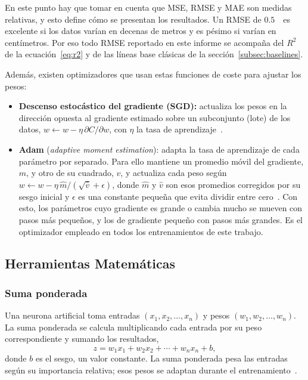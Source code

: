 \documentclass[titlepage,11pt]{article}
\providecommand{\num}[1]{\ensuremath{#1}}
\begin{document}
En este punto hay que tomar en cuenta que MSE, RMSE y MAE son medidas
relativas, y esto define cómo se presentan los resultados. Un RMSE de
\num{0.5}~\meter\ es excelente si los datos varían en decenas de metros y es
pésimo si varían en centímetros. Por eso todo RMSE reportado en este informe se
acompaña del $R^2$ de la ecuación~\eqref{eq:r2} y de las líneas base clásicas
de la sección~\ref{subsec:baselines}.

Además, existen optimizadores que usan estas funciones de coste para ajustar
los pesos:
\begin{itemize}
\item \textbf{Descenso estocástico del gradiente (SGD):} actualiza los pesos en
  la dirección opuesta al gradiente estimado sobre un subconjunto (lote) de los
  datos, $w \leftarrow w - \eta\,\partial C/\partial w$, con $\eta$ la tasa de
  aprendizaje~\cite{goodfellow_2016_deep}.
\item \textbf{Adam} (\emph{adaptive moment estimation}): adapta la tasa de
  aprendizaje de cada parámetro por separado. Para ello mantiene un promedio
  móvil del gradiente, $m$, y otro de su cuadrado, $v$, y actualiza cada peso
  según $w \leftarrow w - \eta\,\hat m/(\sqrt{\hat v}+\epsilon)$, donde $\hat m$
  y $\hat v$ son esos promedios corregidos por su sesgo inicial y $\epsilon$ es
  una constante pequeña que evita dividir entre cero~\cite{kingma_2015_adam}.
  Con esto, los parámetros cuyo gradiente es grande o cambia mucho se mueven
  con pasos más pequeños, y los de gradiente pequeño con pasos más grandes. Es el optimizador
  empleado en todos los entrenamientos de este trabajo.
\end{itemize}

\subsection{Herramientas Matemáticas}
\label{subsec:mat}

\subsubsection{Suma ponderada}
Una neurona artificial toma entradas $(x_1,x_2,\ldots,x_n)$ y pesos
$(w_1,w_2,\ldots,w_n)$. La suma ponderada se calcula multiplicando cada
entrada por su peso correspondiente y sumando los resultados,
\begin{equation}
  z = w_1x_1 + w_2x_2 + \cdots + w_nx_n + b,
\end{equation}
donde $b$ es el sesgo, un valor constante. La suma ponderada pesa las entradas
según su importancia relativa; esos pesos se adaptan durante el
entrenamiento~\cite{triola_2018_estadstica}.
\end{document}
